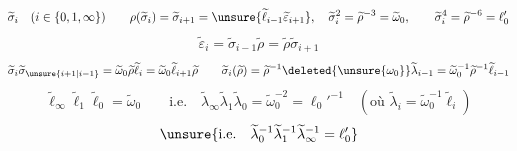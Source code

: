 \[
\widetilde\sigma_i\quad(i\in\{0,1,\infty\})\qquad
\rho(\widetilde\sigma_i)=\widetilde\sigma_{i+1}=\unsure{\widetilde\ell_{i-1}\widetilde\varepsilon_{i+1}},\quad
\widetilde\sigma_i^2=\widetilde\rho^{-3}=\widetilde\omega_0,\qquad
\widetilde\sigma_i^4=\widetilde\rho^{-6}=\ell'_0
\]
\[
\widetilde\varepsilon_i=\widetilde\sigma_{i-1}\widetilde\rho=\widetilde\rho\widetilde\sigma_{i+1}
\]
\[
\widetilde\sigma_i\widetilde\sigma_{\unsure{i+1|i-1}}=\widetilde\omega_0\widetilde\rho\widetilde\ell_i=\widetilde\omega_0\widetilde\ell_{i+1}\widetilde\rho
\qquad
\widetilde\sigma_i(\widetilde\rho)=\widetilde\rho^{-1}\deleted{\unsure{\omega_0}}\widetilde\lambda_{i-1}=\widetilde\omega_0^{-1}\widetilde\rho^{-1}\widetilde\ell_{i-1}
\]
\[
\widetilde\ell_\infty\widetilde\ell_1\widetilde\ell_0=\widetilde\omega_0\qquad\text{i.e.}\quad
\widetilde\lambda_\infty\widetilde\lambda_1\widetilde\lambda_0=\widetilde\omega_0^{-2}=\ell_0'^{-1}
\quad(\text{où }\widetilde\lambda_i=\widetilde\omega_0^{-1}\widetilde\ell_i)
\]
\[
\unsure{\text{i.e.}\quad\widetilde\lambda_0^{-1}\widetilde\lambda_1^{-1}\widetilde\lambda_\infty^{-1}=\ell'_0}
\]

